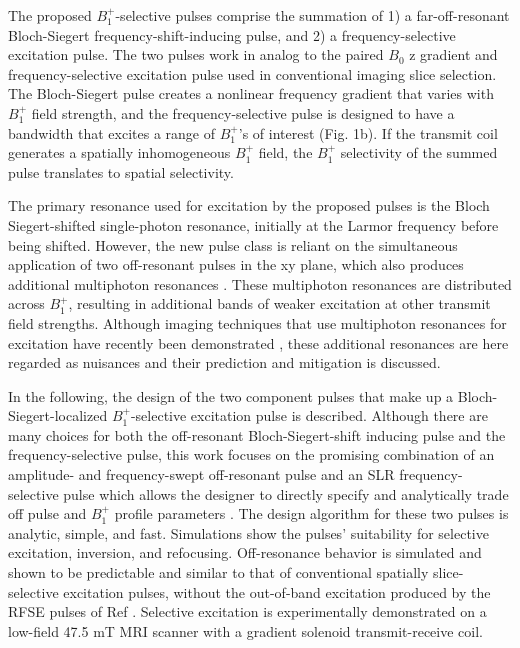 \documentclass{article}
\begin{document}
\par The proposed $B_1^+$-selective pulses comprise the summation of 1) a far-off-resonant Bloch-Siegert frequency-shift-inducing pulse, 
and 2) a frequency-selective excitation pulse. 
The two pulses work in analog to the paired $B_0$ z gradient and frequency-selective excitation pulse used in conventional imaging slice selection. 
The Bloch-Siegert pulse creates a nonlinear frequency gradient that varies with $B_1^+$ field strength, 
and the frequency-selective pulse is designed to have a bandwidth that excites a range of $B_1^+$'s of interest (Fig. 1b). 
If the transmit coil generates a spatially inhomogeneous $B_1^+$ field,
the $B_1^+$ selectivity of the summed pulse translates to spatial selectivity. 

\par The primary resonance used for excitation by the proposed pulses is the Bloch Siegert-shifted single-photon resonance, initially at the Larmor frequency before being shifted. 
However, the new pulse class is reliant on the simultaneous application of two off-resonant pulses in the xy plane, 
which also produces additional multiphoton resonances \cite{Zur1983MultiphotonI=1/2, Krauss1986Four-fieldI=1/2}. 
These multiphoton resonances are distributed across $B_1^+$, 
resulting in additional bands of weaker excitation at other transmit field strengths.
Although imaging techniques that use multiphoton resonances for excitation have recently been demonstrated \cite{Han2020MultiphotonImplementation}, 
these additional resonances are here regarded as nuisances and their prediction and mitigation is discussed.

\par In the following, the design of the two component pulses that make up a Bloch-Siegert-localized $B_1^+$-selective excitation pulse is described. 
Although there are many choices for both the off-resonant Bloch-Siegert-shift inducing pulse and the frequency-selective pulse, 
this work focuses on the promising combination of an amplitude- and frequency-swept off-resonant pulse 
and an SLR frequency-selective pulse which allows the designer to directly specify and 
analytically trade off pulse and $B_1^+$ profile parameters \cite{Pauly1991ParameterAlgorithm}. 
The design algorithm for these two pulses is analytic, simple, and fast. 
Simulations show the pulses' suitability for selective excitation, inversion, and refocusing. 
Off-resonance behavior is simulated and shown to be predictable and similar to that of conventional spatially slice-selective excitation pulses, 
without the out-of-band excitation produced by the RFSE pulses of Ref \cite{Grissom2014B1+-selectiveAlgorithm}. 
Selective excitation is experimentally demonstrated on a low-field 47.5 mT MRI scanner 
with a gradient solenoid transmit-receive coil.
\end{document}
